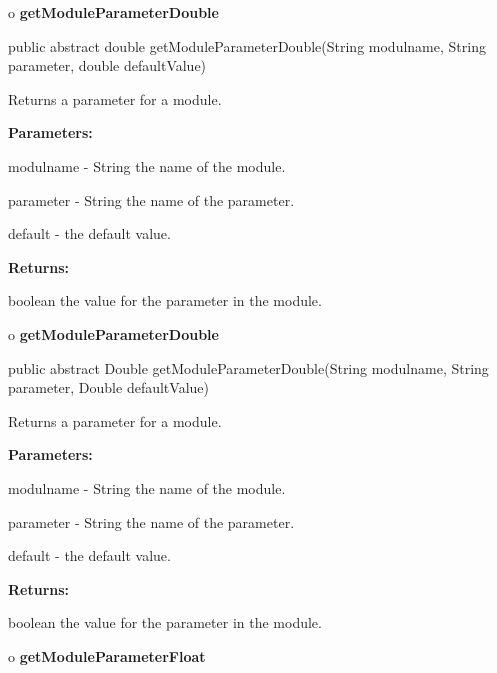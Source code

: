 o {\bf getModuleParameterDouble} 

\begin{PRE}
 public abstract double getModuleParameterDouble(String modulname,
                                                 String parameter,
                                                 double defaultValue)
\end{PRE}

\begin{description}
\htmlDD Returns a parameter for a module. 

\begin{description}
\item {\bf Parameters:}  

modulname - String the name of the module.  

parameter - String the name of the parameter.  

default - the default value.  
\item {\bf Returns:}  

boolean the value for the parameter in the module.  
\end{description}

\end{description}

o {\bf getModuleParameterDouble} 

\begin{PRE}
 public abstract Double getModuleParameterDouble(String modulname,
                                                 String parameter,
                                                 Double defaultValue)
\end{PRE}

\begin{description}
\htmlDD Returns a parameter for a module. 

\begin{description}
\item {\bf Parameters:}  

modulname - String the name of the module.  

parameter - String the name of the parameter.  

default - the default value.  
\item {\bf Returns:}  

boolean the value for the parameter in the module.  
\end{description}

\end{description}

o {\bf getModuleParameterFloat} 

